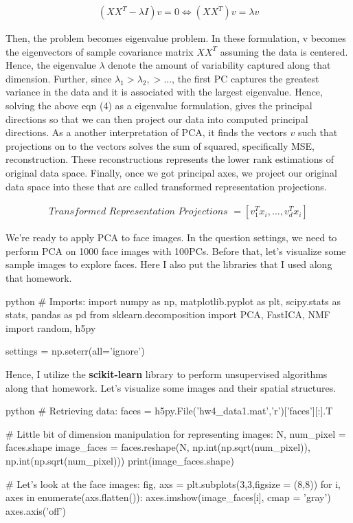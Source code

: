\documentclass[12pt]{amsart}
\begin{document}
\begin{align}
   (XX^T - \lambda I)v = 0 \Leftrightarrow (XX^T)v = \lambda v
\end{align}

Then, the problem becomes eigenvalue problem. In these formulation, v becomes the eigenvectors of sample covariance matrix $XX^T$ assuming the data is centered. Hence, the eigenvalue $\lambda$ denote the amount of variability captured along that dimension. Further, since $\lambda_1 > \lambda_2, > ...$, the first PC captures the greatest variance in the data and it is associated with the largest eigenvalue. Hence, solving the above eqn (4) as a eigenvalue formulation, gives the principal directions so that we can then project our data into computed principal directions. As a another interpretation of PCA, it finds the vectors $v$ such that projections on to the vectors solves the sum of squared, specifically MSE, reconstruction. These reconstructions represents the lower rank estimations of original data space. Finally, once we got principal axes, we project our original data space into these that are called transformed representation projections.


\begin{align}
    \textit{Transformed Representation Projections } = [v_1^Tx_i,...,v_d^Tx_i]
\end{align}


\bigskip
We're ready to apply PCA to face images. In the question settings, we need to perform PCA on 1000 face images with 100PCs. Before that, let's visualize some sample images to explore faces. Here I also put the libraries that I used along that homework.


\begin{mintedbox}{python}
# Imports:
import numpy as np, matplotlib.pyplot as plt, scipy.stats as stats, pandas as pd
from sklearn.decomposition import PCA, FastICA, NMF
import random, h5py

settings = np.seterr(all='ignore')
\end{mintedbox}

Hence, I utilize the \textbf{scikit-learn} library to perform unsupervised algorithms along that homework. Let's visualize some images and their spatial structures.

\begin{mintedbox}{python}
# Retrieving data:
faces = h5py.File('hw4_data1.mat','r')['faces'][:].T

# Little bit of dimension manipulation for representing images:
N, num_pixel = faces.shape
image_faces = faces.reshape(N, np.int(np.sqrt(num_pixel)), np.int(np.sqrt(num_pixel)))
print(image_faces.shape)


# Let's look at the face images:
fig, axs = plt.subplots(3,3,figsize = (8,8))
for i, axes in enumerate(axs.flatten()):
    axes.imshow(image_faces[i], cmap = 'gray')
    axes.axis('off')
\end{mintedbox}
\end{document}
